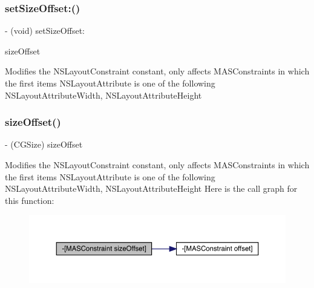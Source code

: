 \subsubsection{\texorpdfstring{set\+Size\+Offset\+:()}{setSizeOffset:()}}
{\footnotesize\ttfamily -\/ (void) set\+Size\+Offset\+: \begin{DoxyParamCaption}\item[{(C\+G\+Size)}]{size\+Offset }\end{DoxyParamCaption}}

Modifies the N\+S\+Layout\+Constraint constant, only affects M\+A\+S\+Constraints in which the first item\textquotesingle{}s N\+S\+Layout\+Attribute is one of the following N\+S\+Layout\+Attribute\+Width, N\+S\+Layout\+Attribute\+Height \mbox{\label{interface_m_a_s_constraint_acc633dbb5dcca4fe450e66b45417ff71}} 
\subsubsection{\texorpdfstring{size\+Offset()}{sizeOffset()}}
{\footnotesize\ttfamily -\/ (C\+G\+Size) size\+Offset \begin{DoxyParamCaption}{ }\end{DoxyParamCaption}}

Modifies the N\+S\+Layout\+Constraint constant, only affects M\+A\+S\+Constraints in which the first item\textquotesingle{}s N\+S\+Layout\+Attribute is one of the following N\+S\+Layout\+Attribute\+Width, N\+S\+Layout\+Attribute\+Height Here is the call graph for this function\+:\nopagebreak
\begin{figure}[H]
\begin{center}
\leavevmode
\includegraphics[width=350pt]{interface_m_a_s_constraint_acc633dbb5dcca4fe450e66b45417ff71_cgraph}
\end{center}
\end{figure}
\mbox{\label{interface_m_a_s_constraint_a66e7e05283761f2e8b87bf597f9b607b}} 

